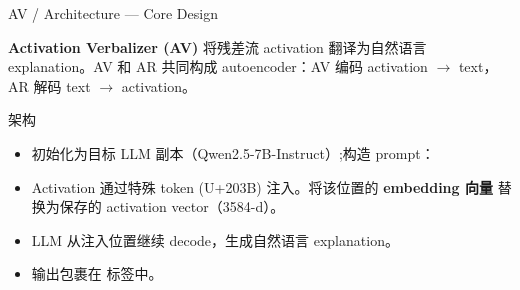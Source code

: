 % 


\begin{frame}{AV / Architecture — Core Design}
\small

\textbf{Activation Verbalizer (AV)} 将残差流 activation 翻译为自然语言 explanation。AV 和 AR 共同构成 autoencoder：AV 编码 activation $\rightarrow$ text，AR 解码 text $\rightarrow$ activation。

\begin{block}{架构}
\begin{itemize}
  \item 初始化为目标 LLM 副本（Qwen2.5-7B-Instruct）;构造 prompt：
  \item Activation 通过特殊 token  (U+203B) 注入。将该位置的 \textbf{embedding 向量} 替换为保存的 activation vector（3584-d）。
  \item LLM 从注入位置继续 decode，生成自然语言 explanation。
  \item 输出包裹在  标签中。
\end{itemize}
\end{block}

\end{frame}


